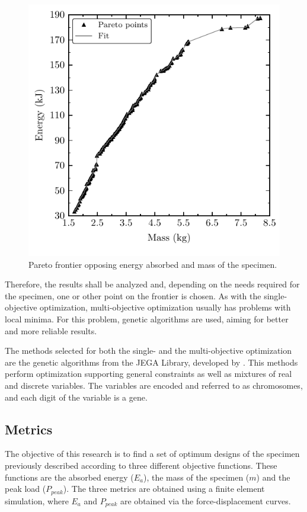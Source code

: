 \documentclass[cmfonts]{witpress}
\begin{document}
\begin{figure}[htpb]
  \centering
   \includegraphics[width=.8\columnwidth]{figures/IMG/Pareto}
  \caption{Pareto frontier opposing energy absorbed and mass of the specimen.}
  \label{fig:Pareto}
\end{figure}

Therefore, the results shall be analyzed and, depending on the needs required for the specimen, one or other point on the frontier is chosen. As with the single-objective optimization, multi-objective optimization usually has problems with local minima. For this problem, genetic algorithms are used, aiming for better and more reliable results.

The methods selected for both the single- and the multi-objective optimization are the genetic algorithms from the JEGA Library, developed by \cite{JEGA}. This methods perform optimization supporting general constraints as well as mixtures of real and discrete variables. The variables are encoded and referred to as chromosomes, and each digit of the variable is a gene.

\subsection{Metrics}

The objective of this research is to find a set of optimum designs of the specimen previously described according to three different objective functions. These functions are the absorbed energy ($E_a$), the mass of the specimen ($m$) and the peak load ($P_{peak}$). The three metrics are obtained using a finite element simulation, where $E_a$ and $P_{peak}$ are obtained via the force-displacement curves.
\end{document}
